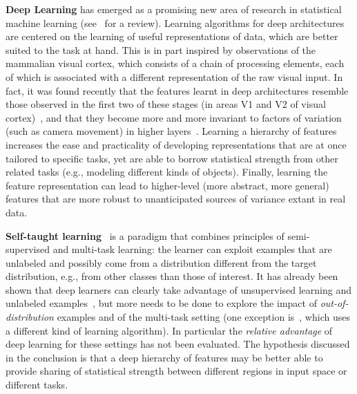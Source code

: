 \documentclass{article} %
\begin{document}
{\bf Deep Learning} has emerged as a promising new area of research in
statistical machine learning (see~\citet{Bengio-2009} for a review).
Learning algorithms for deep architectures are centered on the learning
of useful representations of data, which are better suited to the task at hand.
This is in part inspired by observations of the mammalian visual cortex, 
which consists of a chain of processing elements, each of which is associated with a
different representation of the raw visual input. In fact,
it was found recently that the features learnt in deep architectures resemble
those observed in the first two of these stages (in areas V1 and V2
of visual cortex)~\citep{HonglakL2008}, and that they become more and
more invariant to factors of variation (such as camera movement) in
higher layers~\citep{Goodfellow2009}.
Learning a hierarchy of features increases the
ease and practicality of developing representations that are at once
tailored to specific tasks, yet are able to borrow statistical strength
from other related tasks (e.g., modeling different kinds of objects). Finally, learning the
feature representation can lead to higher-level (more abstract, more
general) features that are more robust to unanticipated sources of
variance extant in real data.

{\bf Self-taught learning}~\citep{RainaR2007} is a paradigm that combines principles
of semi-supervised and multi-task learning: the learner can exploit examples
that are unlabeled and possibly come from a distribution different from the target
distribution, e.g., from other classes than those of interest. 
It has already been shown that deep learners can clearly take advantage of
unsupervised learning and unlabeled examples~\citep{Bengio-2009,WestonJ2008-small},
but more needs to be done to explore the impact
of {\em out-of-distribution} examples and of the multi-task setting
(one exception is~\citep{CollobertR2008}, which uses a different kind
of learning algorithm). In particular the {\em relative
advantage} of deep learning for these settings has not been evaluated.
The hypothesis discussed in the conclusion is that a deep hierarchy of features
may be better able to provide sharing of statistical strength
between different regions in input space or different tasks.
\end{document}
